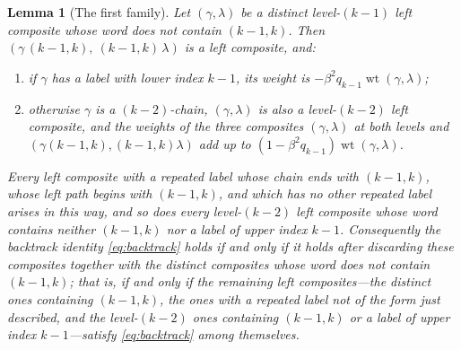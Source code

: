 \documentclass[11pt]{article}
\newtheorem{lemma}[proposition]{Lemma}
\begin{document}
\begin{lemma}[The first family]\label{lem:first-family}
Let $(\gamma,\lambda)$ be a distinct level-$(k-1)$ left composite whose
word does not contain $(k-1,k)$. Then
$(\gamma\,(k-1,k),\ (k-1,k)\,\lambda)$ is a left composite, and:
\begin{enumerate}
\item if $\gamma$ has a label with lower index $k-1$, its weight is
 $-\beta^2q_{k-1}\operatorname{wt}(\gamma,\lambda)$;
\item otherwise $\gamma$ is a $(k-2)$-chain, $(\gamma,\lambda)$ is also
 a level-$(k-2)$ left composite, and the weights of the three
 composites $(\gamma,\lambda)$ at both levels and
 $(\gamma(k-1,k),(k-1,k)\lambda)$ add up to
 $(1-\beta^2q_{k-1})\operatorname{wt}(\gamma,\lambda)$.
\end{enumerate}
Every left composite with a repeated label whose chain ends with
$(k-1,k)$, whose left path begins with $(k-1,k)$, and which has no
other repeated label arises in this way, and so does every level-$(k-2)$
left composite whose word contains neither $(k-1,k)$ nor a label of
upper index $k-1$. Consequently the backtrack identity
\eqref{eq:backtrack} holds if and only if it holds after discarding
these composites together with the distinct composites whose word does
not contain $(k-1,k)$; that is, if and only if the remaining left
composites---the distinct ones containing $(k-1,k)$, the ones with a
repeated label not of the form just described, and the level-$(k-2)$
ones containing $(k-1,k)$ or a label of upper index $k-1$---satisfy
\eqref{eq:backtrack} among themselves.
\end{lemma}
\end{document}
